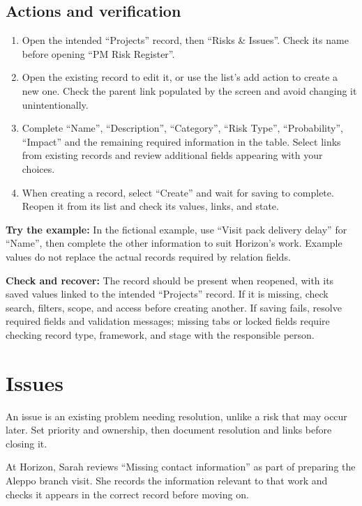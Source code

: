 \subsection{Actions and verification}
\begin{enumerate}
\item Open the intended “Projects” record, then “Risks \& Issues”. Check its name before opening “PM Risk Register”.
\item Open the existing record to edit it, or use the list's add action to create a new one. Check the parent link populated by the screen and avoid changing it unintentionally.
\item Complete “Name”, “Description”, “Category”, “Risk Type”, “Probability”, “Impact” and the remaining required information in the table. Select links from existing records and review additional fields appearing with your choices.
\item When creating a record, select “Create” and wait for saving to complete. Reopen it from its list and check its values, links, and state.
\end{enumerate}

\textbf{Try the example:} In the fictional example, use “Visit pack delivery delay” for “Name”, then complete the other information to suit Horizon's work. Example values do not replace the actual records required by relation fields.

\textbf{Check and recover:} The record should be present when reopened, with its saved values linked to the intended “Projects” record. If it is missing, check search, filters, scope, and access before creating another. If saving fails, resolve required fields and validation messages; missing tabs or locked fields require checking record type, framework, and stage with the responsible person.

\clearpage
\section{Issues}
\label{sec:projects-feature-issues}

An issue is an existing problem needing resolution, unlike a risk that may occur later. Set priority and ownership, then document resolution and links before closing it.

\begin{rcnote}
At Horizon, Sarah reviews “Missing contact information” as part of preparing the Aleppo branch visit. She records the information relevant to that work and checks it appears in the correct record before moving on.
\end{rcnote}

